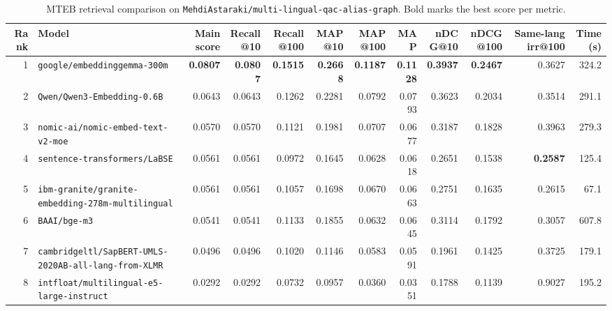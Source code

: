 \begin{table}[t]
\centering
\small
\begin{tabular}{r l r r r r r r r r r r}
\hline
Rank & Model & Main score & Recall@10 & Recall@100 & MAP@10 & MAP@100 & MAP & nDCG@10 & nDCG@100 & Same-lang irr@100 & Time (s) \\
\hline
1 & \texttt{google/embeddinggemma-300m} & \textbf{0.0807} & \textbf{0.0807} & \textbf{0.1515} & \textbf{0.2668} & \textbf{0.1187} & \textbf{0.1128} & \textbf{0.3937} & \textbf{0.2467} & 0.3627 & 324.2 \\
2 & \texttt{Qwen/Qwen3-Embedding-0.6B} & 0.0643 & 0.0643 & 0.1262 & 0.2281 & 0.0792 & 0.0793 & 0.3623 & 0.2034 & 0.3514 & 291.1 \\
3 & \texttt{nomic-ai/nomic-embed-text-v2-moe} & 0.0570 & 0.0570 & 0.1121 & 0.1981 & 0.0707 & 0.0677 & 0.3187 & 0.1828 & 0.3963 & 279.3 \\
4 & \texttt{sentence-transformers/LaBSE} & 0.0561 & 0.0561 & 0.0972 & 0.1645 & 0.0628 & 0.0618 & 0.2651 & 0.1538 & \textbf{0.2587} & 125.4 \\
5 & \texttt{ibm-granite/granite-embedding-278m-multilingual} & 0.0561 & 0.0561 & 0.1057 & 0.1698 & 0.0670 & 0.0663 & 0.2751 & 0.1635 & 0.2615 & 67.1 \\
6 & \texttt{BAAI/bge-m3} & 0.0541 & 0.0541 & 0.1133 & 0.1855 & 0.0632 & 0.0645 & 0.3114 & 0.1792 & 0.3057 & 607.8 \\
7 & \texttt{cambridgeltl/SapBERT-UMLS-2020AB-all-lang-from-XLMR} & 0.0496 & 0.0496 & 0.1020 & 0.1146 & 0.0583 & 0.0591 & 0.1961 & 0.1425 & 0.3725 & 179.1 \\
8 & \texttt{intfloat/multilingual-e5-large-instruct} & 0.0292 & 0.0292 & 0.0732 & 0.0957 & 0.0360 & 0.0351 & 0.1788 & 0.1139 & 0.9027 & 195.2 \\
\hline
\end{tabular}
\caption{MTEB retrieval comparison on \texttt{MehdiAstaraki/multi-lingual-qac-alias-graph}. Bold marks the best score per metric.}
\label{tab:mteb-model-comparison}
\end{table}
